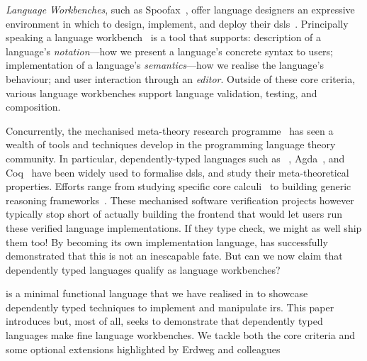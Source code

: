 \emph{Language Workbenches}, such as
Spoofax~\cite{DBLP:journals/software/WachsmuthKV14},
offer language designers an expressive environment in which to design,
implement, and deploy their \Acp{dsl}~\cite{hudak1996building}.
%
Principally speaking a language workbench~\cite{DBLP:conf/sle/ErdwegSVBBCGHKLKMPPSSSVVVWW13}
is a tool that supports:
description of a language's \emph{notation}---how we present a language's concrete syntax to users;
implementation of a language's \emph{semantics}---how we realise the language's behaviour;
and user interaction through an \emph{editor}.
%
Outside of these core criteria, various language workbenches
support language validation, testing, and composition.


Concurrently, the mechanised meta-theory research
programme~\cite{DBLP:conf/tphol/AydemirBFFPSVWWZ05,DBLP:journals/jfp/AbelAHPMSS19}
has seen a wealth of tools and techniques develop
in the programming language theory community.
%
In particular, dependently-typed languages such as
\Idris{}~\cite{DBLP:conf/ecoop/Brady21},
Agda~\cite{DBLP:conf/afp/Norell08},
and Coq~\cite{the_coq_development_team_2022_5846982}
have been widely used to formalise \acp{dsl}, and study their
meta-theoretical properties.
%
Efforts range from
studying specific core calculi~\cite{10.1145/3093333.3009866,DBLP:conf/cpp/RouvoetPKV20,DBLP:conf/mpc/ChapmanKNW19}
to building generic reasoning frameworks~\cite{DBLP:conf/cpp/StarkSK19,DBLP:journals/jfp/AllaisACMM21}.
%
These mechanised software verification projects however typically stop short
of actually building the frontend that would let users run these verified
language implementations.
If they type check, we might as well ship them too!
%
By becoming its own implementation language, \Idris{} has successfully
demonstrated that this is not an inescapable fate.
%
But can we now claim that dependently typed languages qualify as
language workbenches?

\Velo{} is a minimal functional language that we have realised in \Idris{}
to showcase dependently typed techniques to implement and manipulate \acp{ir}.
%
This paper introduces \Velo{} but, most of all, seeks to demonstrate that
dependently typed languages make fine language workbenches.
%
We tackle both the core criteria and some optional extensions
highlighted by Erdweg and colleagues~\cite{DBLP:conf/sle/ErdwegSVBBCGHKLKMPPSSSVVVWW13}



